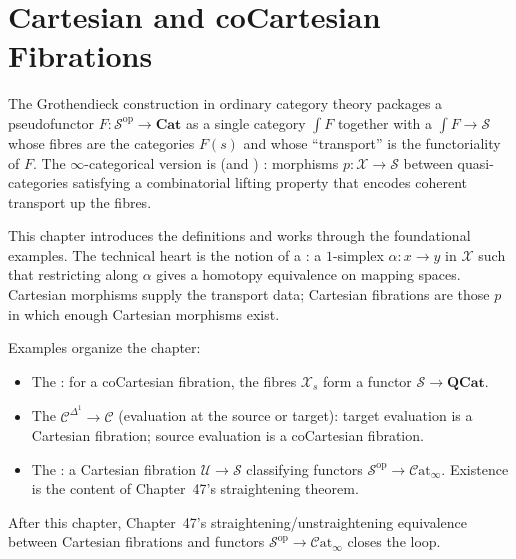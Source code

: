 
\chapter{Cartesian and coCartesian Fibrations}

\begin{overviewbox}
The Grothendieck construction in ordinary category theory packages a
pseudofunctor $F : \mathcal{S}^{\mathrm{op}} \to \mathbf{Cat}$ as a single
category $\int F$ together with a  $\int F \to \mathcal{S}$
whose fibres are the categories $F(s)$ and whose ``transport'' is the
functoriality of $F$. The $\infty$-categorical version is
 (and ) : morphisms
$p : \mathcal{X} \to \mathcal{S}$ between quasi-categories satisfying a
combinatorial lifting property that encodes coherent transport up the
fibres.

This chapter introduces the definitions and works through the foundational
examples. The technical heart is the notion of a : a $1$-simplex $\alpha : x \to y$ in $\mathcal{X}$ such that
restricting along $\alpha$ gives a homotopy equivalence on mapping
spaces. Cartesian morphisms supply the transport data; Cartesian
fibrations are those $p$ in which enough Cartesian morphisms exist.

Examples organize the chapter:
\begin{itemize}
  \item The : for a coCartesian fibration, the
        fibres $\mathcal{X}_s$ form a functor $\mathcal{S} \to
        \mathbf{QCat}$.
  \item The  $\mathcal{C}^{\Delta^1} \to \mathcal{C}$
        (evaluation at the source or target): target evaluation is a
        Cartesian fibration; source evaluation is a coCartesian
        fibration.
  \item The : a Cartesian fibration
        $\mathcal{U} \to \mathcal{S}$ classifying functors
        $\mathcal{S}^{\mathrm{op}} \to \mathcal{C}\mathrm{at}_\infty$.
        Existence is the content of Chapter~47's straightening theorem.
\end{itemize}

After this chapter, Chapter~47's straightening/unstraightening equivalence
between Cartesian fibrations and functors $\mathcal{S}^{\mathrm{op}} \to
\mathcal{C}\mathrm{at}_\infty$ closes the loop.
\end{overviewbox}


